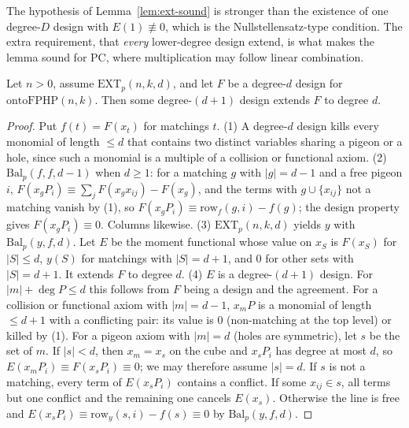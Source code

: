 The hypothesis of Lemma~\ref{lem:ext-sound} is stronger than the existence of one
degree-$D$ design with $E(1)\not\equiv0$, which is the Nullstellensatz-type condition.
The extra requirement, that \emph{every} lower-degree design extend, is what makes the
lemma sound for PC, where multiplication may follow linear combination.

\begin{lemma}\label{lem:ext-step}
Let $n>0$, assume $\mathrm{EXT}_p(n,k,d)$, and let $F$ be a degree-$d$ design for
$\mathrm{ontoFPHP}(n,k)$.  Then some degree-$(d+1)$ design extends $F$ to degree
$d$.
\end{lemma}

\begin{proof}
Put $f(t)=F(x_t)$ for matchings $t$.  (1) A degree-$d$ design kills every monomial
of length $\le d$ that contains two distinct variables sharing a pigeon or a hole, since
such a monomial is a multiple of a collision or functional
axiom.
(2) $\mathrm{Bal}_p(f,f,d-1)$ when $d\ge1$: for a matching $g$ with $|g|=d-1$ and a
free pigeon $i$, $F(x_g P_i)\equiv\sum_j F(x_{g}x_{ij})-F(x_g)$, and the terms with
$g\cup\{x_{ij}\}$ not a matching vanish by (1), so $F(x_gP_i)\equiv
\mathrm{row}_f(g,i)-f(g)$; the design property gives $F(x_gP_i)\equiv0$.  Columns
likewise.
(3) $\mathrm{EXT}_p(n,k,d)$ yields $y$ with $\mathrm{Bal}_p(y,f,d)$.  Let $E$ be the
moment functional whose value on $x_S$ is $F(x_S)$ for $|S|\le d$, $y(S)$ for
matchings with $|S|=d+1$, and $0$ for other sets with $|S|=d+1$.
It extends $F$ to degree $d$.
(4) $E$ is a degree-$(d+1)$ design.  For $|m|+\deg P\le d$ this follows from $F$
being a design and the agreement.
For a collision or functional axiom with $|m|=d-1$, $x_mP$ is a monomial of length
$\le d+1$ with a conflicting pair: its value is $0$ (non-matching at the top
level) or killed by (1).
For a pigeon axiom with $|m|=d$ (holes are symmetric), let $s$ be the set of $m$.  If
$|s|<d$, then $x_m=x_s$ on the cube and $x_sP_i$ has degree at most $d$, so
$E(x_mP_i)\equiv F(x_sP_i)\equiv0$; we may therefore assume $|s|=d$.
If $s$ is not a matching, every term of $E(x_s P_i)$ contains a conflict.  If some
$x_{ij}\in s$, all terms but one conflict and the remaining one cancels $E(x_s)$.
Otherwise the line is free and $E(x_sP_i)\equiv \mathrm{row}_y(s,i)-f(s)\equiv0$ by
$\mathrm{Bal}_p(y,f,d)$.
\end{proof}

